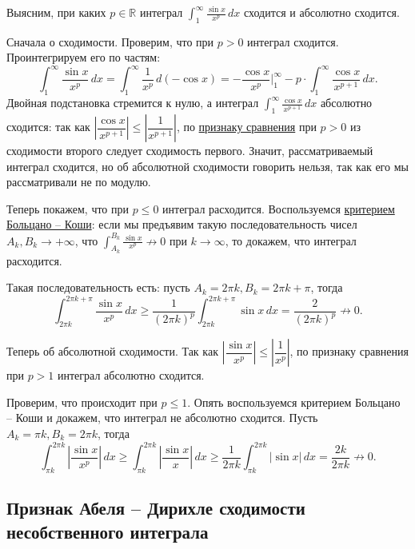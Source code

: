 \begin{example}
	Выясним, при каких \(p \in \mathbb{R}\) интеграл \(\displaystyle \int_1^{\infty} \frac{\sin x}{x^p} \, dx\) сходится и абсолютно сходится.
	
	Сначала о сходимости. Проверим, что при \(p > 0\) интеграл сходится. Проинтегрируем его по частям: \[
	\int_1^{\infty} \frac{\sin x}{x^p} \, dx = \int_{1}^{\infty} \frac{1}{x^p} \, d(-\cos x) = -\frac{\cos x}{x^p} \bigg|_1^\infty - p \cdot \int_{1}^{\infty} \frac{\cos x}{x^{p+1}} \, dx.
	\]
	Двойная подстановка стремится к нулю, а интеграл \(\displaystyle \int_{1}^{\infty} \frac{\cos x}{x^{p+1}} \, dx\) абсолютно сходится: так как \(\left|\dfrac{\cos x}{x^{p+1}} \right| \leqslant \left|\dfrac{1}{x^{p+1}} \right|\), по \hyperlink{priz}{признаку сравнения} при \(p > 0\) из сходимости второго следует сходимость первого. Значит, рассматриваемый интеграл сходится, но об абсолютной сходимости говорить нельзя, так как его мы рассматривали не по модулю.
	
	Теперь покажем, что при \(p \leqslant 0\) интеграл расходится. Воспользуемся \hyperlink{Критерий Больцано -- Коши сходимости несобственного интеграла}{критерием Больцано -- Коши}: если мы предъявим такую последовательность чисел \(A_k, B_k \to +\infty\), что \(\displaystyle \int_{A_k}^{B_k} \frac{\sin x}{x^p} \not\to 0\) при \(k \to \infty\), то докажем, что интеграл расходится.
	
	Такая последовательность есть: пусть \(A_k = 2\pi k, B_k = 2\pi k + \pi\), тогда \[
	\int_{2\pi k}^{2\pi k + \pi} \frac{\sin x}{x^p} \, dx \geqslant \frac{1}{(2\pi k)^p} \int_{2\pi k}^{2\pi k + \pi} \sin x \, dx = \frac{2}{(2\pi k)^p} \not\to 0.
	\]
	
	Теперь об абсолютной сходимости. Так как \(\left|\dfrac{\sin x}{x^p}\right| \leqslant \left|\dfrac{1}{x^p}\right|\), по признаку сравнения при \(p > 1\) интеграл абсолютно сходится.
	
	Проверим, что происходит при \(p \leqslant 1\). Опять воспользуемся критерием Больцано -- Коши и докажем, что интеграл не абсолютно сходится. Пусть \(A_k = \pi k, B_k = 2 \pi k\), тогда \[
	\int_{\pi k}^{2\pi k} \left|\frac{\sin x}{x^p} \right| \, dx \geqslant \int_{\pi k}^{2\pi k} \left|\frac{\sin x}{x} \right| \, dx \geqslant \frac{1}{2\pi k} \int_{\pi k}^{2\pi k} \left|\sin x \right| \, dx = \frac{2k}{2\pi k} \not\to 0.
	\]
\end{example}

\subsection{Признак Абеля -- Дирихле сходимости несобственного интеграла}

